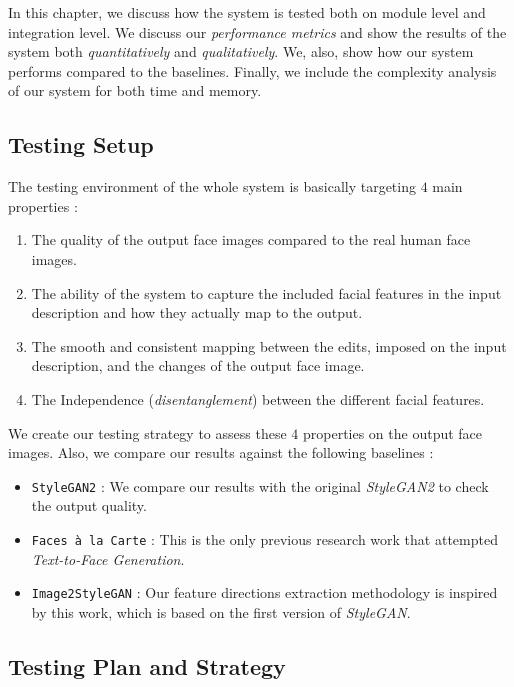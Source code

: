 In this chapter, we discuss how the system is tested both on module level and integration level. We discuss our \emph{performance metrics} and show the results of the system both \emph{quantitatively} and \emph{qualitatively}. We, also, show how our system performs compared to the baselines. Finally, we include the complexity analysis of our system for both time and memory.

\subsection{Testing Setup}

The testing environment of the whole system is basically targeting $4$ main properties :
\begin{enumerate}
    \item The quality of the output face images compared to the real human face images.
    \item The ability of the system to capture the included facial features in the input description and how they actually map to the output.
    \item The smooth and consistent mapping between the edits, imposed on the input description, and the changes of the output face image.
    \item The Independence (\emph{disentanglement}) between the different facial features.
\end{enumerate}

We create our testing strategy to assess these $4$ properties on the output face images. Also, we compare our results against the following baselines :

\begin{itemize}
    \item \texttt{StyleGAN2} \cite{karras2020analyzing} : We compare our results with the original \emph{StyleGAN2} to check the output quality.
    \item \texttt{Faces à la Carte} \cite{wang2020faces} : This is the only previous research work that attempted \emph{Text-to-Face Generation}.
    \item \texttt{Image2StyleGAN} \cite{abdal2019image2stylegan} : Our feature directions extraction methodology is inspired by this work, which is based on the first version of \emph{StyleGAN}.
\end{itemize}

\subsection{Testing Plan and Strategy}

